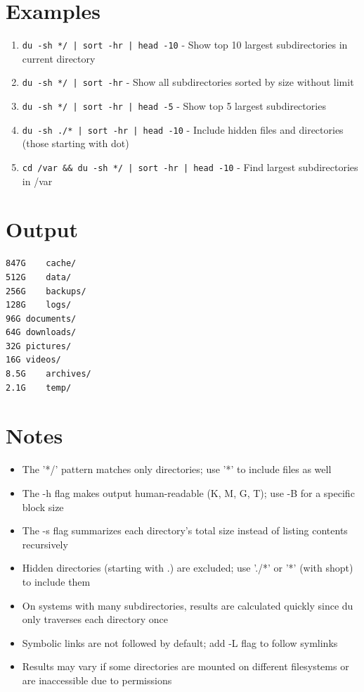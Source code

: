 \documentclass[openany]{book}
\begin{document}
\section*{Examples}
\begin{enumerate}
  \item \texttt{du -sh */ | sort -hr | head -10} - Show top 10 largest subdirectories in current directory
  \item \texttt{du -sh */ | sort -hr} - Show all subdirectories sorted by size without limit
  \item \texttt{du -sh */ | sort -hr | head -5} - Show top 5 largest subdirectories
  \item \texttt{du -sh ./* | sort -hr | head -10} - Include hidden files and directories (those starting with dot)
  \item \texttt{cd /var \&\& du -sh */ | sort -hr | head -10} - Find largest subdirectories in /var
\end{enumerate}

\section*{Output}
\begin{lstlisting}
847G	cache/
512G	data/
256G	backups/
128G	logs/
96G	documents/
64G	downloads/
32G	pictures/
16G	videos/
8.5G	archives/
2.1G	temp/
\end{lstlisting}

\section*{Notes}
\begin{itemize}
  \item The '*/' pattern matches only directories; use '*' to include files as well
  \item The -h flag makes output human-readable (K, M, G, T); use -B for a specific block size
  \item The -s flag summarizes each directory's total size instead of listing contents recursively
  \item Hidden directories (starting with .) are excluded; use './*' or '*' (with shopt) to include them
  \item On systems with many subdirectories, results are calculated quickly since du only traverses each directory once
  \item Symbolic links are not followed by default; add -L flag to follow symlinks
  \item Results may vary if some directories are mounted on different filesystems or are inaccessible due to permissions
\end{itemize}
\end{document}
